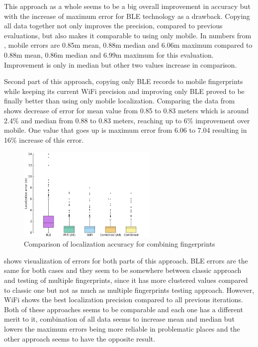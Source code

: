 This approach as a whole seems to be a big overall improvement in accuracy but with the increase of maximum error for BLE technology as a drawback. Copying all data together not only improves the precision, compared to previous evaluations, but also makes it comparable to using only mobile. In numbers from , mobile errors are 0.85m mean, 0.88m median and 6.06m maximum compared to 0.88m mean, 0.86m median and 6.99m maximum for this evaluation. Improvement is only in median but other two values increase in comparison. 

Second part of this approach, copying only BLE records to mobile fingerprints while keeping its current WiFi precision and improving only BLE proved to be finally better than using only mobile localization. Comparing the data from  shows decrease of error for mean value from 0.85 to 0.83 meters which is around 2.4\% and median from 0.88 to 0.83 meters, reaching up to 6\% improvement over mobile. One value that goes up is maximum error from 6.06 to 7.04 resulting in 16\% increase of this error.

\begin{figure}[h!]
	\begin{centering}
		\includegraphics[width=0.6\textwidth]{img/wknn_errors_combined}
		\par\end{centering}
	\caption{Comparison of localization accuracy for combining fingerprints}
	\label{fig08c06}
\end{figure}

 shows visualization of errors for both parts of this approach. BLE errors are the same for both cases and they seem to be somewhere between classic approach and testing of multiple fingerprints, since it has more clustered values compared to classic one but not as much as multiple fingerprints testing approach. However, WiFi shows the best localization precision compared to all previous iterations. Both of these approaches seems to be comparable and each one has a different merit to it, combination of all data seems to increase mean and median but lowers the maximum errors being more reliable in problematic places and the other approach seems to have the opposite result.

